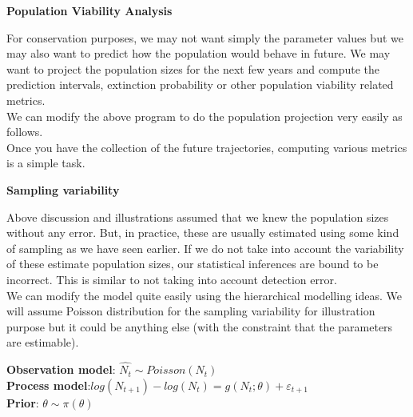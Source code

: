 \documentclass[10pt]{beamer}
\begin{document}
\begin{frame}

\begin{center}
\LARGE \textbf {Population Viability Analysis}
\end{center}
For conservation purposes, we may not want simply the parameter values but we may also want to predict how the population would behave in future. We may want to project the population sizes for the next few years and compute the prediction intervals, extinction probability or other population viability related metrics.\\
\vspace{1em}
\pause
We can modify the above program to do the population projection very easily as follows.\\
\vspace{1em}
\pause
Once you have the collection of the future trajectories, computing various metrics is a simple task. 
\end{frame}

\begin{frame}
\begin{center}
\LARGE \textbf {Sampling variability}
\end{center}
Above discussion and illustrations assumed that we knew the population sizes without any error. But, in practice, these are usually estimated using some kind of sampling as we have seen earlier. If we do not take into account the variability of these \alert{estimate} population sizes, our statistical inferences are bound to be incorrect. This is similar to not taking into account detection error.\\
\vspace{1em}
\pause
We can modify the model quite easily using the hierarchical modelling ideas. We will assume Poisson distribution for the sampling variability for illustration purpose but it could be anything else (with the constraint that the parameters are estimable).\\
\end{frame}

\begin{frame}
\alert{\textbf {Observation model}}:  $\hat{N_{t}}\sim Poisson(N_{t})$ \\
\pause
\vspace{1em}
\alert{\textbf {Process model}}:$ log(N_{t+1})-log(N_{t})=g(N_{t};\theta) + \varepsilon_{t+1} $\\
\pause
\vspace{1em}
\alert{\textbf {Prior}}:  $\theta\sim\pi(\theta)$\\
\end{frame}
\end{document}
